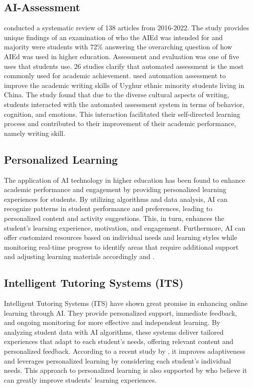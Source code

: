 \subsection{AI-Assessment}
\citep{crompton_artificial_2023} conducted a systematic review of 138 articles from 2016-2022. 
The study provides unique findings of an examination of who the AIEd 
was intended for and majority were students with 72\% 
answering the overarching question of how AIEd was used in higher education. 
Assessment and evaluation was one of five uses that students use. 26 studies 
clarify that automated assessment is the most commonly used for academic achievement. 
\citep{zhang_student_2022} used automation assessment to improve the 
academic writing skills of Uyghur ethnic minority students living in China. 
The study found that due to the diverse cultural aspects of writing, 
students interacted with the automated assessment system in terms of 
behavior, cognition, and emotions. This interaction facilitated their 
self-directed learning process and contributed to their improvement of their 
academic performance, namely writing skill.

\subsection{Personalized Learning}
The application of AI technology in higher education has been found to enhance academic performance
and engagement by providing personalized learning experiences for students. By utilizing algorithms
and data analysis, AI can recognize patterns in student performance and preferences, leading to personalized
content and activity suggestions. This, in turn, enhances the student’s learning experience, motivation, and
engagement. Furthermore, AI can offer customized resources based on individual needs and learning styles while
monitoring real-time progress to identify areas that require additional support and adjusting learning materials
accordingly \citep{guerrero-quinonez_artificial_2023} and \citep{l_d_of_cs_akshara_first_grade_college_2023}.

\subsection{Intelligent Tutoring Systems (ITS)}

Intelligent Tutoring Systems (ITS) have shown great promise in enhancing online learning through  AI.
They provide personalized support, immediate feedback, and ongoing monitoring for more effective and independent learning.
By analyzing student data with AI algorithms, these systems deliver tailored experiences that adapt to each student's needs,
offering relevant content and personalized feedback. According to a recent study by \citep{l_d_of_cs_akshara_first_grade_college_2023},
it improves adaptiveness and leverages personalized learning by considering each student's individual needs.
This approach to personalized learning is also supported by \citep{bradac_design_2022} who believe it can greatly
improve students' learning experiences.

